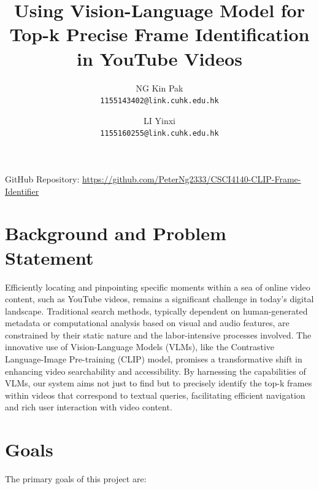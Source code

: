 \documentclass[11pt]{article}
\title{Using Vision-Language Model for Top-k Precise Frame Identification in YouTube Videos}
\author{ NG Kin Pak\\
        \texttt{1155143402@link.cuhk.edu.hk}\and
        LI Yinxi\\
        \texttt{1155160255@link.cuhk.edu.hk}}
\begin{document}
\maketitle

GitHub Repository: \href{https://github.com/PeterNg2333/CSCI4140-CLIP-Frame-Identifier}{https://github.com/PeterNg2333/CSCI4140-CLIP-Frame-Identifier}

\section{Background and Problem Statement}
Efficiently locating and pinpointing specific moments within a sea of online video content, such as YouTube videos,
 remains a significant challenge in today's digital landscape. Traditional search methods, typically dependent on
  human-generated metadata or computational analysis based on visual and audio features, are constrained by their
   static nature and the labor-intensive processes involved. The innovative use of Vision-Language Models (VLMs), 
   like the Contrastive Language-Image Pre-training (CLIP) model, promises a transformative shift in enhancing video 
   searchability and accessibility. By harnessing the capabilities of VLMs, our system aims not just to find but to 
   precisely identify the top-k frames within videos that correspond to textual queries, facilitating efficient 
   navigation and rich user interaction with video content.


\section{Goals}
The primary goals of this project are:
\end{document}
